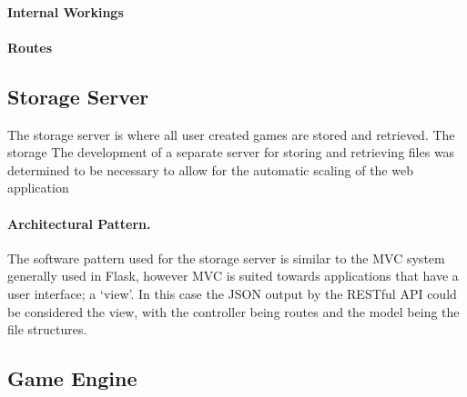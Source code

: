 	\paragraph{Internal Workings} %

	\paragraph{Routes}


	\subsection{Storage Server}
	The storage server is where all user created games are stored and retrieved. The storage 
	The development of a separate server for storing and retrieving files was determined to be necessary to allow for the automatic scaling of the web application

	\paragraph{Architectural Pattern.}
	The software pattern used for the storage server is similar to the MVC system generally used in Flask, however MVC is suited towards applications that have a user interface; a `view'. In this case the JSON output by the RESTful API could be considered the view, with the controller being routes and the model being the file structures.

	\subsection{Game Engine}
